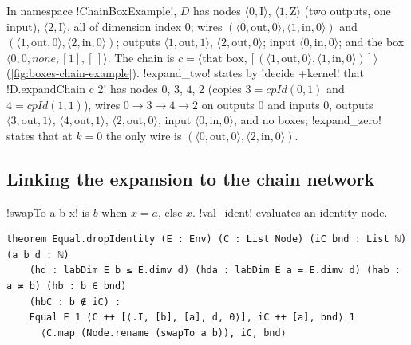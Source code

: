 {\begin{example}\label{ex:boxes-chainbox}
In namespace \lbx!ChainBoxExample!, $D$ has nodes $\langle0,\mathrm I\rangle$, $\langle1,\mathrm Z\rangle$ (two outputs, one input), $\langle2,\mathrm I\rangle$, all of dimension index $0$; wires $(\langle0,\mathrm{out},0\rangle,\langle1,\mathrm{in},0\rangle)$ and $(\langle1,\mathrm{out},0\rangle,\langle2,\mathrm{in},0\rangle)$; outputs $\langle1,\mathrm{out},1\rangle$, $\langle2,\mathrm{out},0\rangle$; input $\langle0,\mathrm{in},0\rangle$; and the box $\langle0,0,\mathit{none},[1],[\,]\rangle$. The chain is $c=\langle\text{that box},[(\langle1,\mathrm{out},0\rangle,\langle1,\mathrm{in},0\rangle)]\rangle$ (\cref{fig:boxes-chain-example}). \lbx!expand_two! states by \lbx!decide +kernel! that \lbx!D.expandChain c 2! has nodes $0$, $3$, $4$, $2$ (copies $3=\mathit{cpId}(0,1)$ and $4=\mathit{cpId}(1,1)$), wires $0\to3\to4\to2$ on outputs $0$ and inputs $0$, outputs $\langle3,\mathrm{out},1\rangle$, $\langle4,\mathrm{out},1\rangle$, $\langle2,\mathrm{out},0\rangle$, input $\langle0,\mathrm{in},0\rangle$, and no boxes; \lbx!expand_zero! states that at $k=0$ the only wire is $(\langle0,\mathrm{out},0\rangle,\langle2,\mathrm{in},0\rangle)$.
\end{example}

\subsection{Linking the expansion to the chain network}

\lbx!swapTo a b x! is $b$ when $x=a$, else $x$. \lbx!val_ident! evaluates an identity node.
\begin{proposition}\label{prop:boxes-dropIdentity}
\begin{lstlisting}[style=leanbox]
theorem Equal.dropIdentity (E : Env) (C : List Node) (iC bnd : List ℕ) (a b d : ℕ)
    (hd : labDim E b ≤ E.dimv d) (hda : labDim E a = E.dimv d) (hab : a ≠ b) (hb : b ∈ bnd)
    (hbC : b ∉ iC) :
    Equal E 1 ⟨C ++ [⟨.I, [b], [a], d, 0⟩], iC ++ [a], bnd⟩ 1
      ⟨C.map (Node.rename (swapTo a b)), iC, bnd⟩
\end{lstlisting}
\end{proposition}

}
